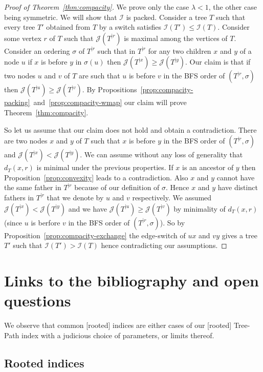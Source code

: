 \documentclass[11 pt]{modarticle}
\newcommand{\distance}[3]{d_{#3}(#1,#2)}
\newcommand{\rtree}[2]{{#1}^{\lvert #2}}
\newcommand{\ortree}[3]{(\rtree{#1}{#2},{#3})}
\newcommand{\indexsymbol}{\mathcal{I}}
\newcommand{\tindex}[1]{\indexsymbol(#1)}
\newcommand{\rindexsymbol}{\mathcal{J}}
\newcommand{\rindex}[2]{\rindexsymbol(\rtree{#2}{#1})}
\begin{document}
\begin{proof}[Proof of Theorem~\ref{thm:compacity}]
We prove only the case $\lambda < 1$, the other case being symmetric. We will show that $\indexsymbol$ is packed. Consider a tree $T$ such that every tree $T'$ obtained from $T$ by a switch satisfies $\tindex{T'} \leq \tindex{T}$. Consider some vertex $r$ of $T$ such that $\rindex{r}{T}$ is maximal among the vertices of $T$. Consider an ordering $\sigma$ of $\rtree{T}{r}$ such that in $\rtree{T}{r}$ for any two children $x$ and $y$ of a node $u$ if $x$ is before $y$ in $\sigma(u)$ then $\rindex{x}{T} \geq \rindex{y}{T}$. Our claim is that if two nodes $u$ and $v$ of $T$ are such that $u$ is before $v$ in the BFS order of $\ortree{T}{r}{\sigma}$ then $\rindex{u}{T} \geq \rindex{v}{T}$. By Propositions~\ref{prop:compacity-packing}~and~\ref{prop:compacity-wmap} our claim will prove Theorem~\ref{thm:compacity}.

So let us assume that our claim does not hold and obtain a contradiction. There are two nodes $x$ and $y$ of $T$ such that $x$ is before $y$ in the BFS order of $\ortree{T}{r}{\sigma}$ and $\rindex{x}{T} < \rindex{y}{T}$. We can assume without any loss of generality that $\distance{x}{r}{T}$ is minimal under the previous properties. If $x$ is an ancestor of $y$ then Proposition~\ref{prop:convexity} leads to a contradiction. Also $x$ and $y$ cannot have the same father in $\rtree{T}{r}$ because of our definition of $\sigma$. Hence $x$ and $y$ have distinct fathers in $\rtree{T}{r}$ that we denote by $u$ and $v$ respectively. We assumed $\rindex{x}{T} < \rindex{y}{T}$ and we have $\rindex{u}{T} \geq \rindex{v}{T}$ by minimality of $\distance{x}{r}{T}$ (since $u$ is berfore $v$ in the BFS order of $\ortree{T}{r}{\sigma}$). So by Proposition~\ref{prop:compacity-exchange} the edge-switch of $ux$ and $vy$ gives a tree $T'$ such that $\tindex{T'} > \tindex{T}$ hence contradicting our assumptions.
\end{proof}

\section{Links to the bibliography and open questions}\label{section:links}

We observe that common [rooted] indices are either cases of our [rooted] Tree-Path index with a judicious choice of parameters, or limits thereof.

\subsection{Rooted indices}
\end{document}
